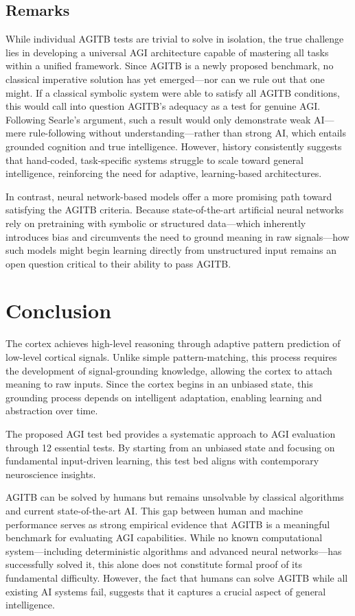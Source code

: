 \documentclass{article}
\begin{document}
\subsection{Remarks}
While individual AGITB tests are trivial to solve in isolation, the true challenge lies in developing a universal AGI architecture capable of mastering all tasks within a unified framework. Since AGITB is a newly proposed benchmark, no classical imperative solution has yet emerged—nor can we rule out that one might. If a classical symbolic system were able to satisfy all AGITB conditions, this would call into question AGITB’s adequacy as a test for genuine AGI. Following Searle’s argument, such a result would only demonstrate weak AI—mere rule-following without understanding—rather than strong AI, which entails grounded cognition and true intelligence. However, history consistently suggests that hand-coded, task-specific systems struggle to scale toward general intelligence, reinforcing the need for adaptive, learning-based architectures.

In contrast, neural network-based models offer a more promising path toward satisfying the AGITB criteria. Because state-of-the-art artificial neural networks rely on pretraining with symbolic or structured data—wh\-ich inherently introduces bias and circumvents the need to ground meaning in raw signals—how such models might begin learning directly from unstructured input remains an open question critical to their ability to pass AGITB.


\section{Conclusion}
The cortex achieves high-level reasoning through adaptive pattern prediction of low-level cortical signals. Unlike simple pattern-matching, this process requires the development of signal-grounding knowledge, allowing the cortex to attach meaning to raw inputs. Since the cortex begins in an unbiased state, this grounding process depends on intelligent adaptation, enabling learning and abstraction over time.

The proposed AGI test bed provides a systematic approach to AGI evaluation through 12 essential tests. By starting from an unbiased state and focusing on fundamental input-driven learning, this test bed aligns with contemporary neuroscience insights.

AGITB can be solved by humans but remains unsolvable by classical algorithms and current state-of-the-art AI. This gap between human and machine performance serves as strong empirical evidence that AGITB is a meaningful benchmark for evaluating AGI capabilities. While no known computational system—including deterministic algorithms and advanced neural networks—has successfully solved it, this alone does not constitute formal proof of its fundamental difficulty. However, the fact that humans can solve AGITB while all existing AI systems fail, suggests that it captures a crucial aspect of general intelligence.
\end{document}
